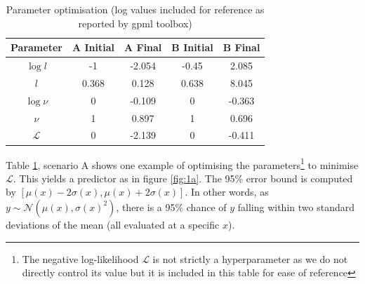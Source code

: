 \documentclass[]{article}
\newcommand{\Ncal}{\mathcal{N}}
\newcommand{\Lcal}{\mathcal{L}}
\begin{document}
\begin{table}[!h]
\centering
\begin{tabular}{c | c c | c c}
	\textbf{Parameter} & \textbf{A Initial} & \textbf{A Final} & \textbf{B Initial} & \textbf{B Final} \\ \hline
	$\log l$           & -1                 & -2.054           & -0.45              & 2.085            \\
	$l$                & 0.368              & 0.128            & 0.638              & 8.045            \\
	$\log \nu$         & 0                  & -0.109           & 0                  & -0.363           \\
	$\nu$              & 1                  & 0.897            & 1                  & 0.696            \\
	$\Lcal$            & 0                  & -2.139           & 0                  & -0.411          
\end{tabular}
\caption{Parameter optimisation (log values included for reference as reported by gpml toolbox)}
\label{tab:hyp-opt}
\end{table}

Table \ref{tab:hyp-opt}, scenario A shows one example of optimising the parameters\footnote{The negative log-likelihood $\Lcal$ is not strictly a hyperparameter as we do not directly control its value but it is included in this table for ease of reference} to minimise $\Lcal$. This yields a predictor as in figure \ref{fig:1a}. The 95\% error bound is computed by $[\mu(x) - 2\sigma(x), \mu(x) + 2\sigma(x)]$. In other words, as $y \sim \Ncal(\mu(x), \sigma(x)^2)$, there is a 95\% chance of $y$ falling within two standard deviations of the mean (all evaluated at a specific $x$).
\end{document}
